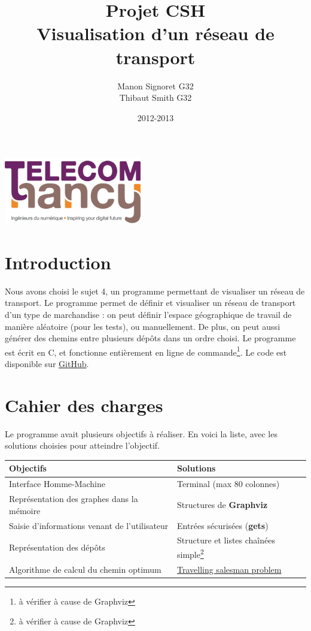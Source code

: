 \documentclass[12pt,a4paper]{report}
\date{2012-2013}
\author{Manon Signoret G32\\Thibaut Smith G32}
\title{Projet CSH\\Visualisation d'un réseau de transport}
\makeatletter
\def\maketitle{
  \null
  \begin{flushleft}
   \includegraphics[width=6cm]{telecom_nancy.png}
  \end{flushleft}
  \vfill
  \begin{center}\leavevmode
    \normalfont
    {\LARGE \@title\par}
    {\Large \@date\par} 
    \vskip 1cm
    
  \end{center}
  \vfill
  \hfill
  \begin{flushright}
    {\Large \@author\par}
  \end{flushright}
  \cleardoublepage
  }
\makeatother
\begin{document}
\thispagestyle{empty}
\maketitle
\pagebreak

\section{Introduction}
Nous avons choisi le sujet 4, un programme permettant de visualiser un réseau de transport. Le programme permet de définir et visualiser un réseau de transport d'un type de marchandise : on peut définir l'espace géographique de travail de manière aléatoire (pour les tests), ou manuellement. De plus, on peut aussi générer des chemins entre plusieurs dépôts dans un ordre choisi. Le programme est écrit en C, et fonctionne entièrement en ligne de commande\footnote{à vérifier à cause de Graphviz}. Le code est disponible sur \href{https://github.com/Videl/Graph-Visualization-Manager}{GitHub}.


\section{Cahier des charges}
Le programme avait plusieurs objectifs à réaliser. En voici la liste, avec les solutions choisies pour atteindre l'objectif.

\begin{center}
  \begin{tabular}{|m{7cm}|m{7cm}|}
    \hline
    Objectifs & Solutions \\
    \hline
    Interface Homme-Machine                          & Terminal (max 80 colonnes) \\
    \hline
    Représentation des graphes dans la mémoire       & Structures de \textbf{Graphviz} \\
    \hline
    Saisie d'informations venant de l'utilisateur    & Entrées sécurisées (\textbf{gets}) \\
    \hline
    Représentation des dépôts                        & Structure et listes chaînées simple\footnote{à vérifier à cause de Graphviz} \\
    \hline
    Algorithme de calcul du chemin optimum           & \href{https://en.wikipedia.org/wiki/Travelling_salesman_problem}{Travelling salesman problem} \\
    \hline
  \end{tabular}
\end{center}
\end{document}
